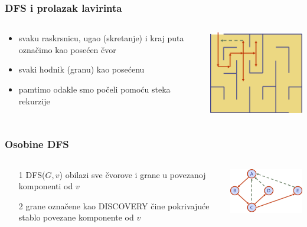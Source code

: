 \documentclass[compress,aspectratio=169]{beamer}
\begin{document}
\begin{frame}[fragile]
  \frametitle{DFS i prolazak lavirinta}
  \begin{columns}
    \begin{column}[t]{6cm}
      \begin{itemize}
        \item svaku raskrsnicu, ugao (skretanje) i kraj puta označimo
          kao posećen čvor
        \item svaki hodnik (granu) kao posećenu
        \item pamtimo odakle smo počeli pomoću steka rekurzije
      \end{itemize}
    \end{column}
    \begin{column}[t]{6cm}
      \begin{center}
        \includegraphics[width=6cm]{asp-14-pic20.png}
      \end{center}
    \end{column}
  \end{columns}
\end{frame}

\begin{frame}[fragile]
  \frametitle{Osobine DFS}
  \begin{columns}
    \begin{column}[t]{6cm}
      \begin{itemize}
        \item[1] DFS($G,v$) obilazi sve čvorove i grane u povezanoj 
          komponenti od $v$
        \item[2] grane označene kao {\scriptsize DISCOVERY} čine 
          pokrivajuće stablo povezane komponente od $v$
      \end{itemize}
    \end{column}
    \begin{column}[t]{6cm}
      \begin{center}
        \includegraphics[width=5cm]{asp-14-pic21.png}
      \end{center}
    \end{column}
  \end{columns}
\end{frame}
\end{document}
